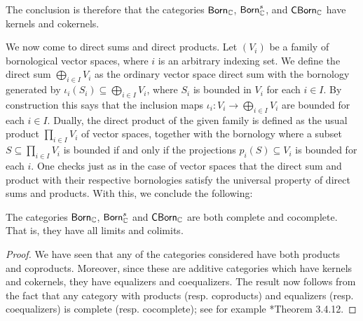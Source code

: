 The conclusion is therefore that the categories \(\mathsf{Born}_\mathbb C\), \(\mathsf{Born}_{\mathbb C}^s\), and \(\mathsf{CBorn}_\mathbb C\) have kernels and cokernels. 


We now come to direct sums and direct products. Let \((V_i)\) be a family of bornological vector spaces, where \(i\) is an arbitrary indexing set. We define the direct sum \(\bigoplus_{i \in I} V_i\) as the ordinary vector space direct sum with the bornology generated by \(\iota_i(S_i) \subseteq  \bigoplus_{i \in I} V_i\), where \(S_i\) is bounded in \(V_i\) for each \(i \in I\). By construction this says that the inclusion maps \(\iota_i \colon V_i \to \bigoplus_{i \in I} V_i\) are bounded for each \(i \in I\). Dually, the direct product of the given family is defined as the usual product \(\prod_{i \in I} V_i\) of vector spaces, together with the bornology where a subset \(S \subseteq \prod_{i \in I} V_i\) is bounded if and only if the projections \(p_i(S) \subseteq V_i\) is bounded for each \(i\). One checks just as in the case of vector spaces that the direct sum and product with their respective bornologies satisfy the universal property of direct sums and products. With this, we conclude the following:


\begin{theorem}\label{thm:bornologies-complete}
The categories \(\mathsf{Born}_{\mathbb C}\), \(\mathsf{Born}_{\mathbb C}^s\) and \(\mathsf{CBorn}_\mathbb C\) are both complete and cocomplete. That is, they have all limits and colimits. 
\end{theorem}

\begin{proof} We have seen that any of the categories considered have both 
products and coproducts. Moreover, since these are additive categories which 
have kernels and cokernels, they have equalizers and coequalizers. 
The result now follows from the fact that any category with products (resp. coproducts) and equalizers (resp. coequalizers) is complete (resp. cocomplete); see for example
\cite{riehl}*{Theorem 3.4.12}. 
\end{proof}

